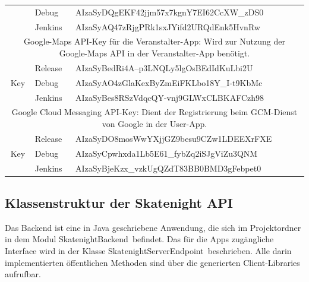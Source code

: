 \begin{tabular}{|c|l|l|}
	\cline{2-3}
	& Debug & AIzaSyDQgEKF42jjm57x7kgnY7EI62CcXW\_zDS0 \\
	\cline{2-3}
	& Jenkins & AIzaSyAQ47zRjgPRk1sxJYifd2URQdEnk5HvnRw \\
	\hline
	\hline
	\multicolumn{3}{|p{15cm}|}{
		Google-Maps API-Key für die Veranstalter-App: Wird zur Nutzung der Google-Maps API in der Veranstalter-App benötigt.
	} \\
	\hline
	\multirow{3}{3mm}{\begin{sideways}Key\end{sideways}} & Release & AIzaSyBedRi4A--p3LNQLy5lgOsBEdIdKuLbi2U \\
	\cline{2-3}
	& Debug & AIzaSyAO4zGlaKexByZmEiFKLbo18Y\_I-t9KbMc \\
	\cline{2-3}
	& Jenkins & AIzaSyBes8RSzVdqcQY-vnj9GLWxCLBKAFCzh98 \\
	\hline
	\hline
	\multicolumn{3}{|p{15cm}|}{
		Google Cloud Messaging API-Key: Dient der Registrierung beim GCM-Dienst von Google in der User-App.
	} \\
	\hline
	\multirow{3}{3mm}{\begin{sideways}Key\end{sideways}} & Release & AIzaSyDO8mosWwYXjjGZ9besu9CZw1LDEEXrFXE \\
	\cline{2-3}
	& Debug & AIzaSyCpwhxda1Lb5E61\_fybZq2iSJgViZu3QNM \\
	\cline{2-3}
	& Jenkins & AIzaSyBjeKzx\_vzkUgQZdT83BB0BMD3gFebpet0 \\
	\hline
\end{tabular}

\subsection{Klassenstruktur der Skatenight API}
Das Backend ist eine in Java geschriebene Anwendung, die sich im Projektordner in dem Modul \glqq SkatenightBackend\grqq\ befindet. Das für die Apps zugängliche Interface wird in der Klasse \glqq SkatenightServerEndpoint\grqq\ beschrieben. Alle darin implementierten öffentlichen Methoden sind über die generierten Client-Libraries aufrufbar.


